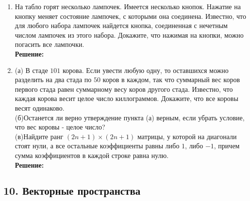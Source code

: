 \documentclass[]{book}
\theoremstyle{definition}
\begin{document}
\begin{enumerate}[resume]
\item На табло горят несколько лампочек. Имеется несколько кнопок. Нажатие на кнопку меняет состояние лампочек, с которыми она соединена. Известно, что для любого набора лампочек найдется кнопка, соединенная с нечетным числом лампочек из этого набора. Докажите, что нажимая на кнопки, можно погасить все лампочки.\\
\textbf{Решение:}

\item (а) В стаде $101$ корова. Если увести любую одну, то оставшихся можно разделить на два стада по $50$ коров в каждом, так что суммарный вес коров первого стада равен суммарному весу коров другого стада. Известно, что каждая корова весит целое число киллограммов. Докажите, что все коровы весят одинаково.\\
(б)Останется ли верно утверждение пункта (а) верным, если убрать условие, что вес коровы - целое число?\\
(в)Найдите ранг $(2n+1)\times (2n+1)$ матрицы, у которой на диагонали стоят нули, а все остальные коэффициенты равны либо $1$, либо $-1$, причем сумма коэффициентов в каждой строке равна нулю.\\
\textbf{Решение:}

\end{enumerate}

\subsection*{10. Векторные пространства}
\end{document}
